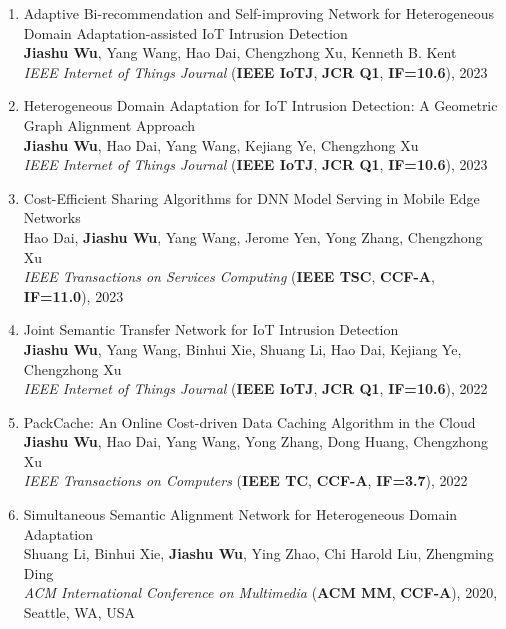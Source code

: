 \documentclass[letterpaper,10.9pt]{article}
\begin{document}
\begin{enumerate}
  \item Adaptive Bi-recommendation and Self-improving Network for Heterogeneous Domain Adaptation-assisted IoT Intrusion Detection\\
  \textbf{Jiashu Wu}, Yang Wang\textsuperscript{\Letter}, Hao Dai, Chengzhong Xu, Kenneth B. Kent\\
  \textit{IEEE Internet of Things Journal} (\textbf{IEEE IoTJ}, \textbf{JCR Q1}, \textbf{IF=10.6}), 2023

  \item Heterogeneous Domain Adaptation for IoT Intrusion Detection: A Geometric Graph Alignment Approach\\
  \textbf{Jiashu Wu}, Hao Dai, Yang Wang\textsuperscript{\Letter}, Kejiang Ye, Chengzhong Xu\\
  \textit{IEEE Internet of Things Journal} (\textbf{IEEE IoTJ}, \textbf{JCR Q1}, \textbf{IF=10.6}), 2023

  \item Cost-Efficient Sharing Algorithms for DNN Model Serving in Mobile Edge Networks\\
  Hao Dai, \textbf{Jiashu Wu}, Yang Wang\textsuperscript{\Letter}, Jerome Yen, Yong Zhang, Chengzhong Xu\\
  \textit{IEEE Transactions on Services Computing} (\textbf{IEEE TSC}, \textbf{CCF-A}, \textbf{IF=11.0}), 2023

  \item Joint Semantic Transfer Network for IoT Intrusion Detection\\
  \textbf{Jiashu Wu}, Yang Wang\textsuperscript{\Letter}, Binhui Xie, Shuang Li, Hao Dai, Kejiang Ye, Chengzhong Xu\\
  \textit{IEEE Internet of Things Journal} (\textbf{IEEE IoTJ}, \textbf{JCR Q1}, \textbf{IF=10.6}), 2022

  \item PackCache: An Online Cost-driven Data Caching Algorithm in the Cloud\\
  \textbf{Jiashu Wu}, Hao Dai, Yang Wang\textsuperscript{\Letter}, Yong Zhang, Dong Huang, Chengzhong Xu\\
  \textit{IEEE Transactions on Computers} (\textbf{IEEE TC}, \textbf{CCF-A}, \textbf{IF=3.7}), 2022

  \item Simultaneous Semantic Alignment Network for Heterogeneous Domain Adaptation\\
  Shuang Li, Binhui Xie, \textbf{Jiashu Wu}, Ying Zhao, Chi Harold Liu\textsuperscript{\Letter}, Zhengming Ding\\
  \textit{ACM International Conference on Multimedia} (\textbf{ACM MM}, \textbf{CCF-A}), 2020, Seattle, WA, USA


\end{enumerate}
\end{document}
